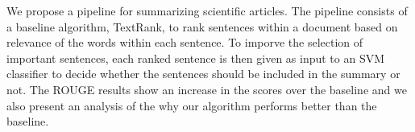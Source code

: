 We propose a pipeline for summarizing scientific articles.
The pipeline consists of a baseline algorithm, TextRank, to rank sentences within a document based on relevance of the words within each sentence.
To imporve the selection of important sentences, each ranked sentence is then given as input to an SVM classifier to decide whether the sentences should be included in the summary or not.
The ROUGE results show an increase in the scores over the baseline and we also present an analysis of the why our algorithm performs better than the baseline.